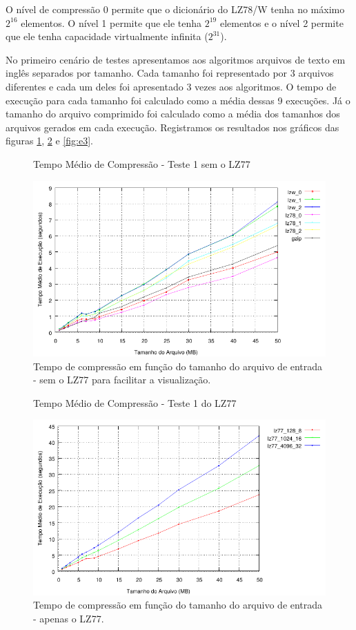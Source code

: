 \documentclass[]{article}
\begin{document}
O nível de compressão 0 permite que o dicionário do LZ78/W tenha no máximo $2^{16}$ elementos. O nível 1 permite que ele tenha $2^{19}$ elementos e o nível 2 permite que ele tenha capacidade virtualmente infinita ($2^{31}$).

No primeiro cenário de testes apresentamos aos algoritmos arquivos de texto em inglês separados por tamanho. Cada tamanho foi representado por 3 arquivos diferentes e cada um deles foi apresentado 3 vezes aos algoritmos. O tempo de execução para cada tamanho foi calculado como a média dessas 9 execuções. Já o tamanho do arquivo comprimido foi calculado como a média dos tamanhos dos arquivos gerados em cada execução. Registramos os resultados nos gráficos das figuras \ref{fig:e1}, \ref{fig:e2} e \ref{fig:e3}.

\begin{figure}
	{\centering Tempo Médio de Compressão - Teste 1 sem o LZ77\par}
	\includegraphics{images/natural_tempo_sem_lz77}
\caption{Tempo de compressão em função do tamanho do arquivo de entrada - sem o LZ77 para facilitar a visualização.}
\label{fig:e1}
\end{figure}

\begin{figure}
	{\centering Tempo Médio de Compressão - Teste 1 do LZ77\par}
	\includegraphics{images/natural_tempo_com_lz77}
\caption{Tempo de compressão em função do tamanho do arquivo de entrada - apenas o LZ77.}
\label{fig:e2}
\end{figure}
\end{document}

